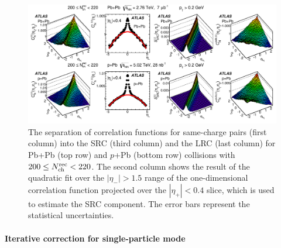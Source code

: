 \begin{figure}[H]
\centering
\includegraphics[width=.95\linewidth]{figs/chapter_fbcorr/ATLAS_SRCremoval_fit.pdf}
\caption{The separation of correlation functions for same-charge pairs (first column) into the SRC (third column) and the LRC (last column) for Pb+Pb (top row) and $p$+Pb (bottom row) collisions with $200 \le N_\text{ch}^\text{rec} < 220$. The second column shows the result of the quadratic fit over the $|\eta_-|>1.5$ range of the one-dimensional correlation function projected over the $|\eta_+|<0.4$ slice, which is used to estimate the SRC component. The error bars represent the statistical uncertainties.}
\label{fig:fbcorr_ATLAS_SRCremoval_fit}
\end{figure}



\paragraph{Iterative correction for single-particle mode}

